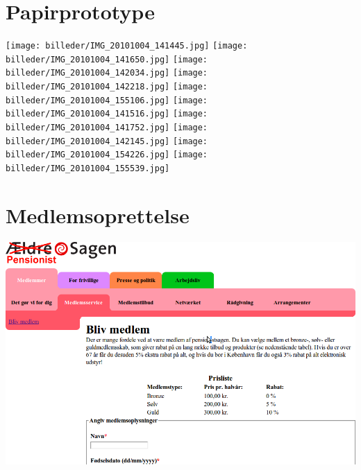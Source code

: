 



\thispagestyle{empty}
\maketitle
\tableofcontents







\renewcommand{\appendixtocname}{Bilag}
\renewcommand{\appendixpagename}{Bilag}

\begin{appendices}
    \newpage
    \section{Papirprototype}
    \label{b:papirprototype}
    \texttt{[image: billeder/IMG\_20101004\_141445.jpg]}
    \newpage
    \texttt{[image: billeder/IMG\_20101004\_141650.jpg]}
    \newpage
    \texttt{[image: billeder/IMG\_20101004\_142034.jpg]}
    \newpage
    \texttt{[image: billeder/IMG\_20101004\_142218.jpg]}
    \newpage
    \label{b:p:koeb}
    \texttt{[image: billeder/IMG\_20101004\_155106.jpg]}
    \newpage
    \texttt{[image: billeder/IMG\_20101004\_141516.jpg]}
    \newpage
    \texttt{[image: billeder/IMG\_20101004\_141752.jpg]}
    \newpage
    \texttt{[image: billeder/IMG\_20101004\_142145.jpg]}
    \newpage
    \label{b:p:tilbud}
    \texttt{[image: billeder/IMG\_20101004\_154226.jpg]}
    \newpage
    \texttt{[image: billeder/IMG\_20101004\_155539.jpg]}
    \newpage
    \section{Medlemsoprettelse}
    \label{b:medlem}
    \includegraphics[width=1\textwidth]{billeder/medlemsoprettelse.png}
\end{appendices}


